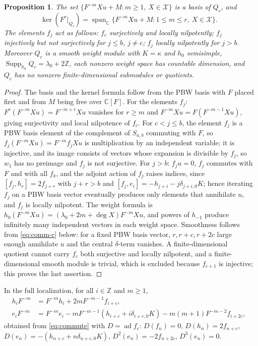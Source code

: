 \documentclass[11pt,a4paper]{article}
\newcommand{\C}{\mathbb C}
\newcommand{\Z}{\mathbb Z}
\newcommand{\ad}{\operatorname{ad}}
\newcommand{\Span}{\operatorname{span}_{\C}}
\newcommand{\X}{\mathcal X}
\newtheorem{proposition}[theorem]{Proposition}
\begin{document}
\begin{proposition}\label{prop:pbw}
The set $\{F^{-m}Xu+M:m\ge1,\ X\in\X\}$ is a basis of $Q_c$, and
\[
 \ker(F^r|_{Q_c})=\Span\{F^{-m}Xu+M:1\le m\le r,\ X\in\X\}.
\]
The elements $f_j$ act as follows: $f_c$ surjectively and locally
nilpotently; $f_j$ injectively but not surjectively for $j\le b$, $j\ne c$;
$f_j$ locally nilpotently for $j>b$. Moreover $Q_c$ is a smooth weight
module with $K=\kappa$ and $h_0$ semisimple,
$\operatorname{Supp}_{h_0}Q_c=\lambda_0+2\Z$, each nonzero weight space
has countable dimension, and $Q_c$ has no nonzero finite-dimensional
submodules or quotients.
\end{proposition}
\begin{proof}
The basis and the kernel formula follow from the PBW basis with $F$ placed
first and from $M$ being free over $\C[F]$. For the elements $f_j$:
$F^r(F^{-m}Xu)=F^{-m+r}Xu$ vanishes for $r\ge m$ and
$F^{-m}Xu=F(F^{-m-1}Xu)$, giving surjectivity and local nilpotence of
$f_c$. For $c<j\le b$, the element $f_j$ is a PBW basis element of the
complement of $S_{a,b}$ commuting with $F$, so $f_j(F^{-m}Xu)=F^{-m}f_jXu$
is multiplication by an independent variable; it is injective, and its
image consists of vectors whose expansion is divisible by $f_j$, so $w_1$
has no preimage and $f_j$ is not surjective. For $j>b$: $f_ju=0$, $f_j$
commutes with $F$ and with all $f_k$, and the adjoint action of $f_j$
raises indices, since $[f_j,h_r]=2f_{j+r}$ with $j+r>b$ and
$[f_j,e_i]=-h_{j+i}-j\delta_{j+i,0}K$; hence iterating $f_j$ on a PBW
basis vector eventually produces only elements that annihilate $u$, and
$f_j$ is locally nilpotent. The weight formula is
$h_0(F^{-m}Xu)=(\lambda_0+2m+\deg X)F^{-m}Xu$, and powers of $h_{-1}$
produce infinitely many independent vectors in each weight space.
Smoothness follows from \eqref{eq:comm-c} below: for a fixed PBW basis
vector, $r,r+c,r+2c$ large enough annihilate $u$ and the central
$\delta$-term vanishes. A finite-dimensional quotient cannot carry $f_c$
both surjective and locally nilpotent, and a finite-dimensional smooth
module is trivial, which is excluded because $f_{c+1}$ is injective; this
proves the last assertion.
\end{proof}

In the full localization, for all $i\in\Z$ and $m\ge1$,
\begin{equation}\label{eq:comm-c}
\begin{aligned}
 h_iF^{-m}&=F^{-m}h_i+2mF^{-m-1}f_{i+c},\\
 e_iF^{-m}&=F^{-m}e_i-mF^{-m-1}(h_{i+c}+i\delta_{i+c,0}K)
 -m(m+1)F^{-m-2}f_{i+2c},
\end{aligned}
\end{equation}
obtained from \eqref{eq:commute} with $D=\ad f_c$:
$D(f_n)=0$, $D(h_n)=2f_{n+c}$, $D(e_n)=-(h_{n+c}+n\delta_{n+c,0}K)$,
$D^2(e_n)=-2f_{n+2c}$, $D^3(e_n)=0$.
\end{document}
